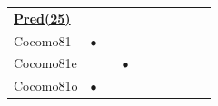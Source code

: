 \documentclass{sig-alternate}
\begin{document}
\begin{figure}[!t]
\begin{tabular}{lccccccccc|}
%
\hline\multicolumn{10}{l}{  \underline{{\bf Pred(25)}}}	\\
Cocomo81	&	$\bullet$	&		&		&		&		&		&		&		&		\\
Cocomo81e	&		&		&	$\bullet$	&		&		&		&		&		&		\\
Cocomo81o	&	$\bullet$	&		&		&		&		&		&		&		&		\\

\end{tabular}
\end{figure}
\end{document}
